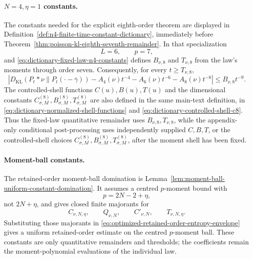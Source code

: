 \paragraph{\(N=4,\eta=1\) constants.}
The constants needed for the explicit eighth-order theorem are displayed in
Definition~\ref{def:n4-finite-time-constant-dictionary}, immediately before
Theorem~\ref{thm:poisson-kl-eighth-seventh-remainder}.  In that specialization
\[
L=6,\qquad p=7,
\]
and \eqref{eq:dictionary-fixed-law-n4-constants} defines
\(B_{\nu,8}\) and \(T_{\nu,8}\) from the law's moments through order seven.
Consequently, for every \(t\ge T_{\nu,8}\),
\begin{equation}\label{eq:optimized-n4-seventh-envelope}
\left|
D_{\mathrm{KL}}(P_t*\nu\|P_t(\cdot-\bar{\gamma}))
-A_4(\nu)t^{-4}
-A_6(\nu)t^{-6}
-A_8(\nu)t^{-8}
\right|
\le B_{\nu,8}t^{-9}.
\end{equation}
The controlled-shell functions \(C(u),B(u),T(u)\) and the dimensional
constants \(C_{\sigma,M}^{(8)},B_{\sigma,M}^{(8)},T_{\sigma,M}^{(8)}\) are
also defined in the same main-text definition, in
\eqref{eq:dictionary-normalized-shell-functions} and
\eqref{eq:dictionary-controlled-shell-c8}.  Thus the fixed-law quantitative
remainder uses \(B_{\nu,8},T_{\nu,8}\), while the appendix-only conditional
post-processing uses independently supplied \(C,B,T\), or the controlled-shell
choices \(C_{\sigma,M}^{(8)},B_{\sigma,M}^{(8)},T_{\sigma,M}^{(8)}\), after
the moment shell has been fixed.

\paragraph{Moment-ball constants.}
\label{cor:uniform-moment-ball-entropy-remainder}
The retained-order moment-ball domination is
Lemma~\ref{lem:moment-ball-uniform-constant-domination}.  It assumes a
centred \(p\)-moment bound with
\[
p=2N-2+\eta,
\]
not \(2N+\eta\), and gives closed finite majorants for
\[
C_{\nu,N,\eta},\qquad Q_{\nu,N},\qquad C'_{\nu,N},\qquad T_{\nu,N,\eta}.
\]
Substituting those majorants in
\eqref{eq:optimized-retained-order-entropy-envelope} gives a uniform
retained-order estimate on the centred \(p\)-moment ball.  These constants
are only quantitative remainders and thresholds; the coefficients remain the
moment-polynomial evaluations of the individual law.

